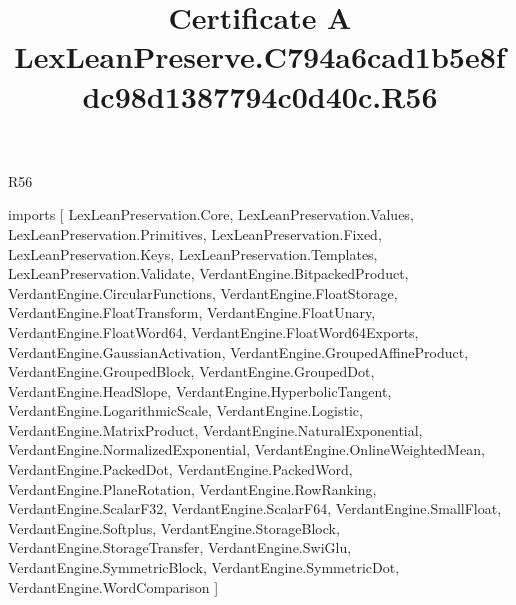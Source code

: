 \begin{lexlean}{R56}
\title{Certificate A LexLeanPreserve.C794a6cad1b5e8fdc98d1387794c0d40c.R56}
\begin{coremodule}
imports [
  LexLeanPreservation.Core,
  LexLeanPreservation.Values,
  LexLeanPreservation.Primitives,
  LexLeanPreservation.Fixed,
  LexLeanPreservation.Keys,
  LexLeanPreservation.Templates,
  LexLeanPreservation.Validate,
  VerdantEngine.BitpackedProduct,
  VerdantEngine.CircularFunctions,
  VerdantEngine.FloatStorage,
  VerdantEngine.FloatTransform,
  VerdantEngine.FloatUnary,
  VerdantEngine.FloatWord64,
  VerdantEngine.FloatWord64Exports,
  VerdantEngine.GaussianActivation,
  VerdantEngine.GroupedAffineProduct,
  VerdantEngine.GroupedBlock,
  VerdantEngine.GroupedDot,
  VerdantEngine.HeadSlope,
  VerdantEngine.HyperbolicTangent,
  VerdantEngine.LogarithmicScale,
  VerdantEngine.Logistic,
  VerdantEngine.MatrixProduct,
  VerdantEngine.NaturalExponential,
  VerdantEngine.NormalizedExponential,
  VerdantEngine.OnlineWeightedMean,
  VerdantEngine.PackedDot,
  VerdantEngine.PackedWord,
  VerdantEngine.PlaneRotation,
  VerdantEngine.RowRanking,
  VerdantEngine.ScalarF32,
  VerdantEngine.ScalarF64,
  VerdantEngine.SmallFloat,
  VerdantEngine.Softplus,
  VerdantEngine.StorageBlock,
  VerdantEngine.StorageTransfer,
  VerdantEngine.SwiGlu,
  VerdantEngine.SymmetricBlock,
  VerdantEngine.SymmetricDot,
  VerdantEngine.WordComparison
]


\end{coremodule}
\end{lexlean}
